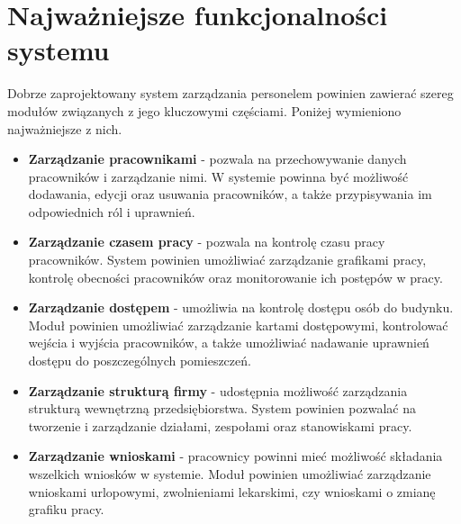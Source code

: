 
\section{Najważniejsze funkcjonalności systemu}


Dobrze zaprojektowany system zarządzania personelem powinien zawierać szereg modułów związanych z jego kluczowymi częściami. Poniżej wymieniono najważniejsze z nich.

\begin{itemize}
    \item \textbf{Zarządzanie pracownikami} - pozwala na przechowywanie danych pracowników i zarządzanie nimi. W systemie powinna być możliwość dodawania, edycji oraz usuwania pracowników, a także przypisywania im odpowiednich ról i uprawnień.
    \item \textbf{Zarządzanie czasem pracy} - pozwala na kontrolę czasu pracy pracowników. System powinien umożliwiać zarządzanie grafikami pracy, kontrolę obecności pracowników oraz monitorowanie ich postępów w pracy.
    \item \textbf{Zarządzanie dostępem} - umożliwia na kontrolę dostępu osób do budynku. Moduł powinien umożliwiać zarządzanie kartami dostępowymi, kontrolować wejścia i wyjścia pracowników, a także umożliwiać nadawanie uprawnień dostępu do poszczególnych pomieszczeń.
    \item \textbf{Zarządzanie strukturą firmy} - udostępnia możliwość zarządzania strukturą wewnętrzną przedsiębiorstwa. System powinien pozwalać na tworzenie i zarządzanie działami, zespołami oraz stanowiskami pracy.
    \item \textbf{Zarządzanie wnioskami} - pracownicy powinni mieć możliwość składania wszelkich wniosków w systemie. Moduł powinien umożliwiać zarządzanie wnioskami urlopowymi, zwolnieniami lekarskimi, czy wnioskami o zmianę grafiku pracy.
\end{itemize}


